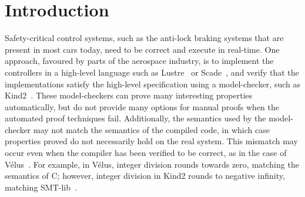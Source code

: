 \documentclass[sigplan,screen, review]{acmart}
\begin{document}



\maketitle

\makeatactive

\section{Introduction}

Safety-critical control systems, such as the anti-lock braking systems that are present in most cars today, need to be correct and execute in real-time.
One approach, favoured by parts of the aerospace industry, is to implement the controllers in a high-level language such as Lustre~\cite{caspi1995functional} or Scade~\cite{colaco2017scade}, and verify that the implementations satisfy the high-level specification using a model-checker, such as Kind2~\cite{champion2016kind2}.
These model-checkers can prove many interesting properties automatically, but do not provide many options for manual proofs when the automated proof techniques fail.
Additionally, the semantics used by the model-checker may not match the semantics of the compiled code, in which case properties proved do not necessarily hold on the real system.
This mismatch may occur even when the compiler has been verified to be correct, as in the case of Vélus~\cite{bourke2017formally}.
For example, in Vélus, integer division rounds towards zero, matching the semantics of C; however, integer division in Kind2 rounds to negative infinity, matching SMT-lib~\cite{BarFT2016SMTLIB,kind2023intdiv}.
\end{document}

